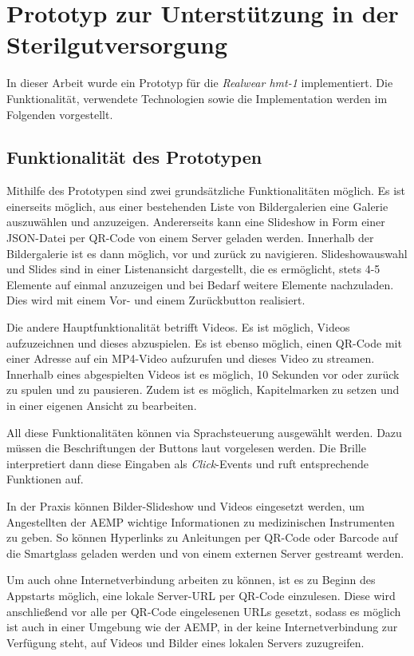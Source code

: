 %
%
%
%
%
%
\chapter{Prototyp zur Unterstützung in der Sterilgutversorgung}
\label{ch:Prototyp}
In dieser Arbeit wurde ein Prototyp für die \emph{Realwear hmt-1} implementiert. Die Funktionalität, verwendete Technologien sowie die Implementation werden im Folgenden vorgestellt.
%
%
%
%
%
%
\section{Funktionalität des Prototypen}
Mithilfe des Prototypen sind zwei grundsätzliche Funktionalitäten möglich. Es ist einerseits möglich, aus einer bestehenden Liste von Bildergalerien eine Galerie auszuwählen und anzuzeigen. Andererseits kann eine Slideshow in Form einer JSON-Datei per QR-Code von einem Server geladen werden. Innerhalb der Bildergalerie ist es dann möglich, vor und zurück zu navigieren. 
Slideshowauswahl und Slides sind in einer Listenansicht dargestellt, die es ermöglicht, stets 4-5 Elemente auf einmal anzuzeigen und bei Bedarf weitere Elemente nachzuladen. Dies wird mit einem Vor- und einem Zurückbutton realisiert.

Die andere Hauptfunktionalität betrifft Videos. Es ist möglich,  Videos aufzuzeichnen und dieses abzuspielen. Es ist ebenso möglich, einen QR-Code mit einer Adresse auf ein MP4-Video aufzurufen und dieses Video zu streamen. Innerhalb eines abgespielten Videos ist es möglich, 10 Sekunden vor oder zurück zu spulen und zu pausieren. Zudem ist es möglich, Kapitelmarken zu setzen und in einer eigenen Ansicht zu bearbeiten.

All diese Funktionalitäten können via Sprachsteuerung ausgewählt werden. Dazu müssen die Beschriftungen der Buttons laut vorgelesen werden. Die Brille interpretiert dann diese Eingaben als \emph{Click}-Events und ruft entsprechende Funktionen auf.

In der Praxis können Bilder-Slideshow und Videos eingesetzt werden, um Angestellten der AEMP wichtige Informationen zu medizinischen Instrumenten zu geben. So können Hyperlinks zu Anleitungen per QR-Code oder Barcode auf die Smartglass geladen werden und von einem externen Server gestreamt werden.

Um auch ohne Internetverbindung arbeiten zu können, ist es zu Beginn des Appstarts möglich, eine lokale Server-URL per QR-Code einzulesen. Diese wird anschließend vor alle per QR-Code eingelesenen URLs gesetzt, sodass es möglich ist auch in einer Umgebung wie der AEMP, in der keine Internetverbindung zur Verfügung steht, auf Videos und Bilder eines lokalen Servers zuzugreifen. 

